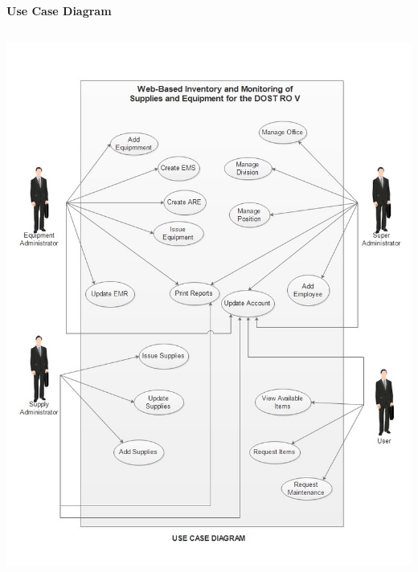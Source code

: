 \begin{center} 
	\textbf{Use Case Diagram}
\end{center}
\begin{center}
	\includegraphics[width=14cm,height=18cm]{image/d-1.jpg}
\end{center}
\vfill

\newpage

